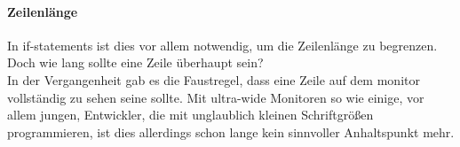         \paragraph{Zeilenlänge}
            In if-statements ist dies vor allem notwendig, um die Zeilenlänge zu begrenzen.\\
            Doch wie lang sollte eine Zeile überhaupt sein?\\
            In der Vergangenheit gab es die Faustregel, dass eine Zeile auf dem monitor vollständig zu sehen seine sollte.
            Mit ultra-wide Monitoren so wie einige, vor allem jungen, Entwickler, die mit unglaublich kleinen Schriftgrößen programmieren, ist dies allerdings schon lange kein sinnvoller Anhaltspunkt mehr.
            
